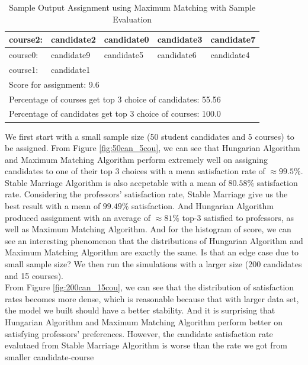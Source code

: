 \documentclass[twoside,twocolumn]{article}
\begin{document}
    \begin{table}[t]
        \centering
        \begin{tabular}{|l|l|l|l|l|}
        \hline
        course2:      & candidate2     & candidate0     & candidate3     & candidate7     \\ \hline
        course0:      & candidate9     & candidate5     & candidate6     & candidate4     \\ \hline
        course1:      & \multicolumn{4}{l|}{candidate1}                                   \\ \hline
        \multicolumn{5}{|l|}{Score for assignment: 9.6}                                   \\ \hline
        \multicolumn{5}{|l|}{Percentage of courses get top 3 choice of candidates: 55.56} \\ \hline
        \multicolumn{5}{|l|}{Percentage of candidates get top 3 choice of courses: 100.0} \\ \hline
        \end{tabular}
        \caption{Sample Output Assignment using Maximum Matching with Sample Evaluation}
    \end{table}
    We first start with a small sample size (50 student candidates and 5 courses) to be assigned. From Figure \ref{fig:50can_5cou}, we can see that Hungarian Algorithm and
    Maximum Matching Algorithm perform extremely well on assigning candidates to one of their top 3 choices with a mean satisfaction rate of $\approx 99.5\%$. Stable Marriage
    Algorithm is also accpetable with a mean of $80.58\%$ satisfaction rate. Considering the professors' satisfaction rate, Stable Marriage give us the best result with
    a mean of $99.49\%$ satisfaction. And Hungarian Algorithm produced assignment with an average of $\approx 81\%$ top-3 satisfied to professors, as well as Maximum Matching
    Algorithm. And for the histogram of score, we can see an interesting phenomenon that the distributions of Hungarian Algorithm and Maximum Matching Algorithm are
    exactly the same. Is that an edge case due to small sample size? We then run the simulations with a larger size (200 candidates and 15 courses).
    \\ \indent From Figure \ref{fig:200can_15cou}, we can see that the distribution of satisfaction rates becomes more dense, which is reasonable because that with
    larger data set, the model we built should have a better stability. And it is surprising that Hungarian Algorithm and Maximum Matching Algorithm perform better on 
    satisfying professors' preferences. However, the candidate satisfaction rate evalutaed from Stable Marriage Algorithm is worse than the rate we got from smaller candidate-course
\end{document}
